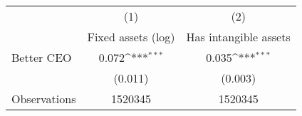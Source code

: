 {
\def\sym#1{\ifmmode^{#1}\else\(^{#1}\)\fi}
\begin{tabular}{l*{2}{c}}
\hline\hline
                    &\multicolumn{1}{c}{(1)}&\multicolumn{1}{c}{(2)}\\
                    &\multicolumn{1}{c}{Fixed assets (log)}&\multicolumn{1}{c}{Has intangible assets}\\
\hline
Better CEO          &       0.072\sym{***}&       0.035\sym{***}\\
                    &     (0.011)         &     (0.003)         \\
\hline
Observations        &     1520345         &     1520345         \\
\hline\hline
\end{tabular}
}
